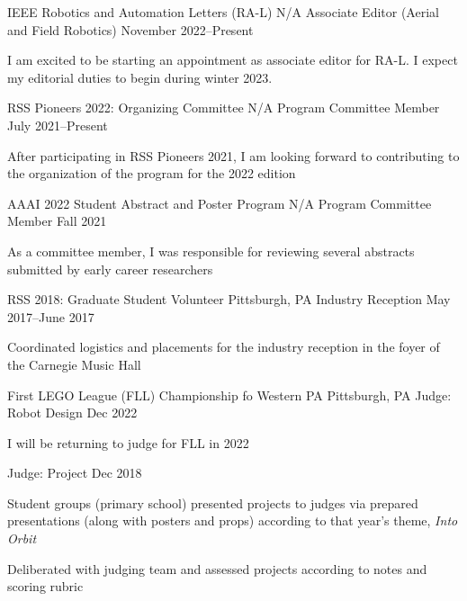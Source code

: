 
\begin{cventries}
  \cventry
  {IEEE Robotics and Automation Letters (RA-L)}
  {N/A}
  {Associate Editor (Aerial and Field Robotics)}
  {November 2022--Present}
  {
    \begin{cvitems}
      \item I am excited to be starting an appointment as associate editor for
        RA-L.
        I expect my editorial duties to begin during winter 2023.
    \end{cvitems}
  }
  \cventry
  {RSS Pioneers 2022: Organizing Committee}
  {N/A}
  {Program Committee Member}
  {July 2021--Present}
  {
    \begin{cvitems}
    \item After participating in RSS Pioneers 2021, I am looking forward to
      contributing to the organization of the program for the 2022 edition
    \end{cvitems}
  }
  \cventry
  {AAAI 2022 Student Abstract and Poster Program}
  {N/A}
  {Program Committee Member}
  {Fall 2021}
  {
    \begin{cvitems}
    \item As a committee member, I was responsible for reviewing several
      abstracts submitted by early career researchers
    \end{cvitems}
  }
  \cventry
  {RSS 2018: Graduate Student Volunteer}
  {Pittsburgh, PA}
  {Industry Reception}
  {May 2017--June 2017}
  {
    \begin{cvitems}
    \item Coordinated logistics and placements for the industry reception
      in the foyer of the Carnegie Music Hall
    \end{cvitems}
  }
  \cventrytwo
  {First LEGO League (FLL) Championship fo Western PA}
  {Pittsburgh, PA}
  {Judge: Robot Design}
  {Dec 2022}
  {
    \begin{cvitems}
    \item I will be returning to judge for FLL in 2022
    \end{cvitems}
  }
  {Judge: Project}
  {
    Dec 2018
  }
  {
    \begin{cvitems}
    \item Student groups (primary school) presented projects to judges via
      prepared presentations (along with posters and props) according to that
      year's theme, \emph{Into Orbit}
    \item Deliberated with judging team and assessed projects according to
      notes and scoring rubric
    \end{cvitems}
  }
\end{cventries}
